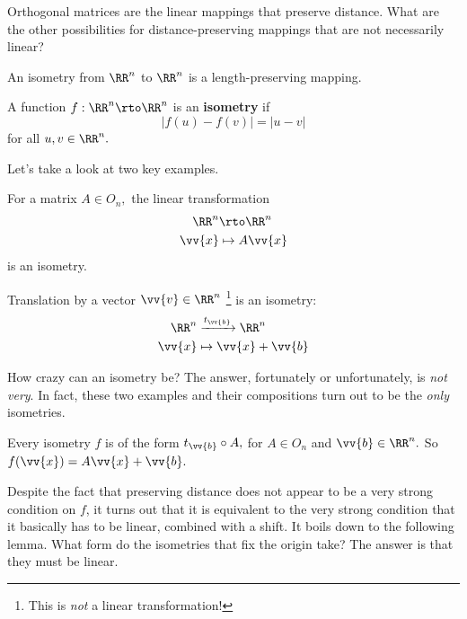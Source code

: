 \begin{qq}
Orthogonal matrices are the linear mappings that preserve distance. What are the other possibilities for distance-preserving mappings that are not necessarily linear?
\end{qq}

An isometry from $\RR^n$ to $\RR^n$ is a length-preserving mapping. 

\begin{definition}
A function $f: \RR^n \rto \RR^n$ is an \textbf{isometry} if 
\[
|f(u) - f(v)| = |u - v|
\]
for all $u, v \in \RR^n.$
\end{definition}

Let's take a look at two key examples.

\begin{example}
For a matrix $A \in O_n,$ the linear transformation 
\begin{align*}
\RR^n &\rto \RR^n \\
\vv{x} &\mapsto A\vv{x}
\end{align*}
is an isometry.
\end{example}


\begin{example}
Translation by a vector $\vv{v} \in \RR^n$ \footnote{This is \emph{not} a linear transformation!} is an isometry:
\begin{align*}
    \RR^n &\xrightarrow[]{t_{\vv{b}}} \RR^n \\
    \vv{x} &\mapsto \vv{x} + \vv{b}
\end{align*}
\end{example}

How crazy can an isometry be? The answer, fortunately or unfortunately, is \emph{not very}. In fact, these two examples and their compositions turn out to be the \emph{only} isometries. 

\begin{theorem}\label{isometry linear trans}
Every isometry $f$ is of the form $t_{\vv{b}}\circ A,$ for $A \in O_n$ and $\vv{b} \in \RR^n.$ So $f(\vv{x}) = A\vv{x} + \vv{b}.$
\end{theorem}

Despite the fact that preserving distance does not appear to be a very strong condition on $f$, it turns out that it is equivalent to the very strong condition that it basically has to be linear, combined with a shift. It boils down to the following lemma. What form do the isometries that fix the origin take? The answer is that they must be linear.

